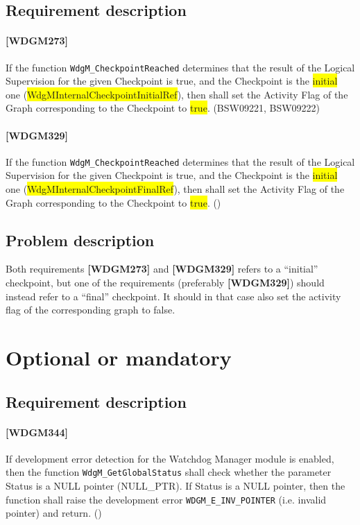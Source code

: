 \subsection{Requirement description}
\paragraph{[WDGM273]} If the function
\lstinline!WdgM_CheckpointReached! determines that the result of the
Logical Supervision for the given Checkpoint is true, and the
Checkpoint is the \colorbox{yellow}{initial} one
(\colorbox{yellow}{WdgMInternalCheckpointInitialRef}), then shall set
the Activity Flag of the Graph corresponding to the Checkpoint to
\colorbox{yellow}{true}. (BSW09221, BSW09222)

\paragraph{[WDGM329]} If the function
\lstinline!WdgM_CheckpointReached! determines that the result of the
Logical Supervision for the given Checkpoint is true, and the
Checkpoint is the \colorbox{yellow}{initial} one
(\colorbox{yellow}{WdgMInternalCheckpointFinalRef}), then shall set
the Activity Flag of the Graph corresponding to the Checkpoint to
\colorbox{yellow}{true}. ()

\subsection{Problem description}
Both requirements \textbf{[WDGM273]} and \textbf{[WDGM329]} refers to
a ``initial'' checkpoint, but one of the requirements (preferably
\textbf{[WDGM329]}) should instead refer to a ``final'' checkpoint. It
should in that case also set the activity flag of the corresponding
graph to false.

\section{Optional or mandatory}
\subsection{Requirement description}
\paragraph{[WDGM344]} If development error detection for the Watchdog
Manager module is enabled, then the function \lstinline!WdgM_GetGlobalStatus!
shall check whether the parameter Status is a NULL pointer
(NULL\_PTR). If Status is a NULL pointer, then the function shall raise
the development error \lstinline!WDGM_E_INV_POINTER! (i.e. invalid pointer) and
return.  ()


